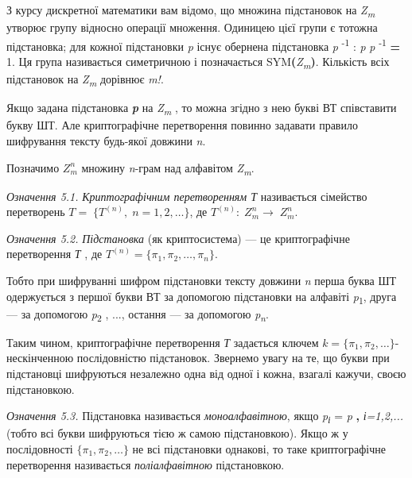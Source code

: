 З курсу дискретної математики вам відомо, що множина підстановок на
\textit{Z}\textit{\textsubscript{m}}\textsubscript{ } утворює групу відносно
операції множення. Одиницею цієї групи є тотожна підстановка; для кожної
підстановки \textit{\textgreek{p}}\textbf{ } існує обернена підстановка
\textit{\textgreek{p}}\textit{ }\textsuperscript{{}-1} :
\textit{\textgreek{p}}\textsf{\textit{ }}\textit{\textgreek{p}}
\textsuperscript{{}-1}\textbf{ = }1. Ця група називається симетричною і
позначається SYM\textbf{(}\textit{Z}\textit{\textsubscript{m}}\textbf{)}.
Кількість всіх підстановок на
\textit{Z}\textit{\textsubscript{m}}\textsubscript{ } дорівнює
\textit{m}\textit{!}.

Якщо задана підстановка \textbf{\textit{\textgreek{p}}}\textbf{\textit{ }} на
\textit{Z}\textit{\textsubscript{m}}\textsubscript{ }, то можна згідно з нею
букві ВТ  співставити букву ШТ. Але криптографічне перетворення повинно
задавати правило шифрування тексту будь-якої довжини \textit{n}.

Позначимо  ${Z_{{m}}^{{n}}}$ множину \textit{n}{}-грам над алфавітом
\textit{Z}\textit{\textsubscript{m}}.

\textit{Означення 5.1.}\textit{ Криптографічним перетворенням Т }називається
сімейство перетворень  ${T=\;\{T^{{(n)}},\;n=1,2,\dots\}}$,
де  ${T^{{(n)}}:\;Z_{{m}}^{{n}}\rightarrow \;Z_{{m}}^{{n}}}$\textsf{.}

\textit{Означення 5.2.}\textit{ Підстановка}\textbf{\textit{ }}(як
криптосистема) --- це криптографічне перетворення \textit{Т}\textbf{\textit{ }},
де  ${T^{{(n)}}=\{\pi _{{1}},\pi _{{2}},\dots,\pi
_{{n}}\}}$.

Тобто при шифруванні шифром підстановки тексту довжини \textit{n} перша буква ШТ
одержується з першої букви ВТ за допомогою підстановки на алфавіті
\textit{\textgreek{p}}\textsubscript{1}, друга --- за допомогою
\textit{\textgreek{p}}\textsubscript{2 }, ..., остання --- за допомогою
\textit{\textgreek{p}}\textit{\textsubscript{n}}.

Таким чином, криптографічне перетворення \textit{Т} задається ключем  ${k=\{\pi
_{{1}},\pi _{{2}},\dots\}}${}- нескінченною послідовністю
підстановок. Звернемо увагу на те, що букви при підстановці шифруються
незалежно одна від одної і кожна, взагалі кажучи, своєю підстановкою.

\textit{Означення 5.3.}\textit{ }Підстановка називається
\textit{моноалфавітною}, якщо\textbf{
}\textit{\textgreek{p}}\textit{\textsubscript{і}} =\textsf{\textit{
}}\textit{\textgreek{p}}\textbf{ , }\textit{і=1,2,...} (тобто всі букви
шифруються тією ж самою підстановкою). Якщо ж у послідовності   ${\{\pi
_{{1}},\pi _{{2}},\dots\}}$ не всі підстановки однакові, то
таке криптографічне перетворення називається \textit{поліалфавітною}
підстановкою.

